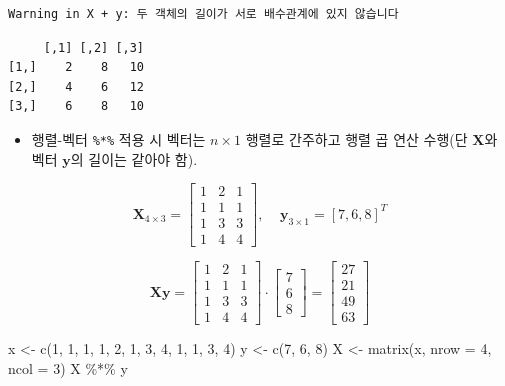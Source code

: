 \documentclass[
  11pt,
]{krantz}
\newenvironment{Shaded}{\begin{snugshade}}{\end{snugshade}}
\newcommand{\AttributeTok}[1]{\textcolor[rgb]{0.61,0.61,0.61}{#1}}
\newcommand{\DecValTok}[1]{\textcolor[rgb]{0.06,0.06,0.06}{#1}}
\newcommand{\FunctionTok}[1]{\textcolor[rgb]{0,0,0}{#1}}
\newcommand{\NormalTok}[1]{#1}
\newcommand{\OtherTok}[1]{\textcolor[rgb]{0.37,0.37,0.37}{#1}}
\newcommand{\SpecialCharTok}[1]{\textcolor[rgb]{0,0,0}{#1}}
\providecommand{\tightlist}{%
  \setlength{\itemsep}{0pt}\setlength{\parskip}{0pt}}
\begin{document}
\begin{verbatim}
Warning in X + y: 두 객체의 길이가 서로 배수관계에 있지 않습니다
\end{verbatim}

\begin{verbatim}
     [,1] [,2] [,3]
[1,]    2    8   10
[2,]    4    6   12
[3,]    6    8   10
\end{verbatim}

\normalsize

\begin{itemize}
\tightlist
\item
  행렬-벡터 \texttt{\%*\%} 적용 시 벡터는 \(n \times 1\) 행렬로 간주하고 행렬 곱 연산 수행(단 \(\mathrm{\mathbf X}\)와 벡터 \(\mathrm{\mathbf y}\)의 길이는 같아야 함).
\end{itemize}

\[\mathrm{\mathbf{X}}_{4\times 3} = 
\begin{bmatrix}
1 & 2 & 1 \\
1 & 1 & 1 \\
1 & 3 & 3 \\
1 & 4 & 4 
\end{bmatrix}, ~~~~~
\mathrm{\mathbf y}_{3\times 1} = [7, 6, 8]^T
\]

\[\mathrm{\mathbf{X}}\mathrm{\mathbf{y}} = 
\begin{bmatrix}
1 & 2 & 1 \\
1 & 1 & 1 \\
1 & 3 & 3 \\
1 & 4 & 4 
\end{bmatrix} \cdot 
\begin{bmatrix}
7 \\
6 \\
8
\end{bmatrix} = 
\begin{bmatrix}
27 \\
21 \\
49 \\
63
\end{bmatrix}
\]

\footnotesize

\begin{Shaded}
\begin{Highlighting}[]
\NormalTok{x }\OtherTok{\textless{}{-}} \FunctionTok{c}\NormalTok{(}\DecValTok{1}\NormalTok{, }\DecValTok{1}\NormalTok{, }\DecValTok{1}\NormalTok{, }\DecValTok{1}\NormalTok{, }\DecValTok{2}\NormalTok{, }\DecValTok{1}\NormalTok{, }\DecValTok{3}\NormalTok{, }\DecValTok{4}\NormalTok{, }\DecValTok{1}\NormalTok{, }\DecValTok{1}\NormalTok{, }\DecValTok{3}\NormalTok{, }\DecValTok{4}\NormalTok{)}
\NormalTok{y }\OtherTok{\textless{}{-}} \FunctionTok{c}\NormalTok{(}\DecValTok{7}\NormalTok{, }\DecValTok{6}\NormalTok{, }\DecValTok{8}\NormalTok{)}
\NormalTok{X }\OtherTok{\textless{}{-}} \FunctionTok{matrix}\NormalTok{(x, }\AttributeTok{nrow =} \DecValTok{4}\NormalTok{, }\AttributeTok{ncol =} \DecValTok{3}\NormalTok{)}
\NormalTok{X }\SpecialCharTok{\%*\%}\NormalTok{ y}
\end{Highlighting}
\end{Shaded}
\end{document}
